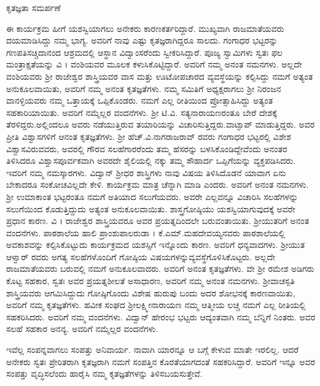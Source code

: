 {ಕೃತಜ್ಞತಾ ಸಮರ್ಪಣೆ \enginline{-}

ಈ ಕಾರ್ಯಕ್ರಮ ಹೀಗೆ ಯಶಸ್ವಿಯಾಗಲು  ಅನೇಕರು ಕಾರಣಕರ್ತರಿದ್ದಾರೆ. ಮುಖ್ಯವಾಗಿ ರಾಜಮಾತೆಯವರು ದಯಮಾಡಿಸಿದ್ದು ನಮ್ಮ ಭಾಗ್ಯ. ಅವರಿಗೆ ನಾವು ಎಷ್ಟು ಕೃತಜ್ಞರಾಗಿದ್ದರೂ ಸಾಲದು. ಗಂಗಾಧರ ಭಟ್ಟರನ್ನು ಗಣಪತಿಸಚ್ಚಿದಾನಂದ ಆಶ್ರಮ\-ದಲ್ಲಿ ಆಸ್ಥಾನ ವಿದ್ವಾಂಸರೆಂದು ಸ್ವೀಕರಿಸಿದ್ದಾರೆ. ಪೂಜ್ಯ ಸ್ವಾಮಿಗಳು ಸ್ವತಃ ಫಲ ಮಂತ್ರಾಕ್ಷತೆಯನ್ನು ವಿ । ವಂಶಿಯವರ ಮೂಲಕ ಕಳುಸಿಕೊಟ್ಟಿದ್ದಾರೆ. ಅವರಿಗೆ ನಮ್ಮ ಅನಂತ ನಮನಗಳು. ಅಲ್ಲದೇ ವಂಶಿಯವರು  ಶ್ರೀ ರಾಜೇಶ್ವರ ಶಾಸ್ತ್ರಿಯವರ ವಾಸ ಮತ್ತು ಊಟೋಪಚಾರದ ವ್ಯವಸ್ಥೆಯನ್ನು ಕಲ್ಪಿಸಿದ್ದು ನಮಗೆ ಅತ್ಯಂತ ಅನುಕೂಲ\-ವಾಯಿತು, ಅವರಿಗೆ ನಮ್ಮ ಅನಂತ ಕೃತಜ್ಞತೆಗಳು. ನಮ್ಮ ಸಮಿತಿಗೆ ಅಧ್ಯಕ್ಷರಾಗಲು ಶ್ರೀ ನಿರಂಜನ ವಾನಳ್ಳಿಯವರು ನಮ್ಮ ಒತ್ತಾಯಕ್ಕೆ ಒಪ್ಪಿಕೊಂಡರು.  ನಮಗೆ ಎಲ್ಲ ರೀತಿಯಿಂದ ಪ್ರೋತ್ಸಾಹಿಸಿದ್ದು ಅತ್ಯಂತ ಸಹಕಾರಿಯಾಯಿತು. ಅವರಿಗೆ ನಮ್ಮೆಲ್ಲರ ವಂದನೆಗಳು. ಶ್ರೀ ಟಿ.ವಿ. ಸತ್ಯನಾರಾಯಣರಂತೂ ಬೇರೆ ದೇಶಕ್ಕೆ ತೆರಳಿದ್ದರು.\break ಅಲ್ಲಿಂದಲೂ ಅವರು ನಡೆಯುತ್ತಿರುವ ತಯಾರಿಯನ್ನು ವಿಚಾರಿಸುತ್ತಿದ್ದರು.\break ವಾಟ್ಸಾಪ್ ಮಾಡುತ್ತಿದ್ದರು.  ಅವರ ಪ್ರೀತಿ ವಿಶ್ವಾಸಗಳಿಗೆ ಆನಂತ ಕೃತಜ್ಞತೆಗಳು. ಶ್ರೀ ಹೆಚ್.ವಿ.ನಾಗರಾಜರಾವ್ ರವರು ಗಂಗಾಧರ ಭಟ್ಟರಲ್ಲಿ ವಿಶೇಶ ವಿಶ್ವಾಸವಿರುವವರು, ಅವರಲ್ಲಿ ಗೌರವ ಸಲಹೆಗಾರರೆಂದು ತಮ್ಮ ಹೆಸರನ್ನು ಬಳಸಿಕೊಂಡಿದ್ದೇವೆಂದು ಅನಂತರ ತಿಳಿಸಿದರೂ ವಿಶ್ವಾಸಪೂರ್ವಕವಾಗಿ ಅವರದೇ ಶೈಲಿಯಲ್ಲಿ ನಕ್ಕು ತಮ್ಮ ಸೌಹಾರ್ದ ಒಪ್ಪಿಗೆಯನ್ನು ವ್ಯಕ್ತಪಡಿಸಿದರು. ಇವರಿಗೆ ನಮ್ಮ ನಮಸ್ಕಾರಗಳು. ವಿದ್ವಾನ್ ಶ್ರೀಧರ ಶಾಸ್ತ್ರಿಗಳು ನಾವು ವಿಷಯ ತಿಳಿಸಿದೊಡನೆ ಯಾವಾಗ ಏನು ಬೇಕಾದರೂ ಸಂಕೋಚವಿಲ್ಲದೇ ಕೇಳಿ. ಕಾರ್ಯಕ್ರಮ ಮಾತ್ರ ಚೆನ್ನಾಗಿ ಮಾಡಿ ಎಂದರು. ಅವರಿಗೆ ಅನಂತ ನಮನ\-ಗಳು. ಶ್ರೀ ಉಮಾಕಾಂತ ಭಟ್ಟರಂತೂ ನಮಗೆ ಅತಿಯಾದ ಸಲುಗೆಯವರು. ಅವರೇ ಎಲ್ಲವನ್ನೂ ವಿಚಾರಿಸಿ ಸಲಹೆಗಳನ್ನು ಸಲುಗೆಯಿಂದ ಕೊಡುತ್ತಿದ್ದುದು ಅತ್ಯಂತ ಅನುಕೂಲ\-ವಾಯಿತು. ಶಾಸ್ತ್ರಗೋಷ್ಠಿಯು ಯಶಸ್ವಿಯಾಗುವುದಕ್ಕೆ ಅವರೇ ಪ್ರಧಾನ ಕಾರಣ. ವಿ । ರಾಜೇಶ್ವರ ಶಾಸ್ತ್ರಿಯವರೂ ಅವರ ಪ್ರಯತ್ನದಿಂದಲೇ ಬರುವಂತಾಯಿತು. ಶ್ರೀಯುತರಿಗೆ ಅನಂತ ವಂದನೆಗಳು. ಪಾಠಶಾಲೆಯ ಹಾಲಿ ಪ್ರಾಂಶುಪಾಲರು\break ಡಾ । ಕೆ.ಎಮ್.ಮಹದೇವಯ್ಯನವರು ಪಾಠಶಾಲೆಯಲ್ಲಿ ಅವಕಾಶವನ್ನು ಕಲ್ಪಿಸಿ\-ಕೊಟ್ಟುದು ಕಾರ್ಯಕ್ರಮದ ಯಶಸ್ಸಿಗೆ ಇನ್ನೊಂದು ಕಾರಣ. ಅವರಿಗೆ ಧನ್ಯವಾದಗಳು. ಶ್ರೀಯುತ ಆಳ್ವಾರ್ ರವರು ಅಗತ್ಯ ಸಲಹೆಗಳೊಂದಿಗೆ ಗೋಷ್ಠಿಯ ವಿಷಯಗಳನ್ನು\break ವ್ಯವಸ್ಥೆಗೊಳಿಸಿಕೊಟ್ಟರು. ಅಲ್ಲದೇ ರಾಜಮಾತೆಯವರು ಬರುವಲ್ಲಿ ನಮಗೆ ಅನುಕೂಲವಾದರು. ಅವರಿಗೆ ಅನಂತ ಕೃತಜ್ಞತೆಗಳು. ವೇ ಶ್ರೀ ರಮೇಶ ಅಡಿಗರು ಕೊಟ್ಟ ಸಹಕಾರ, ಸ್ವತಃ ಅವರ ಪ್ರಯತ್ನಶೀಲತೆ ಅಸಾಧಾರಣ, ಅವರಿಗೆ ನಮ್ಮ ಅನಂತ ನಮನಗಳು.  ಶ್ರೀವಾಚಸ್ಪತಿ ಶಾಸ್ತ್ರಿಯವರು  ಆಗಮಿಸಿದ್ದುದು ಗೋಷ್ಠಿಗೊಂದು ವಿಶೇಷ ಹುರುಪು ಬಂದು ಅದರ  ಶೋಭನಕ್ಕೆ ಕಾರಣವಾಯಿತು, ಅವರಿಗೆ ನಮ್ಮ ಕೃತಜ್ಞತೆಗಳು. ಹವೀಕ ಸಂಘದ ಶ್ರೀಲಕ್ಷ್ಮೀನಾರಾಯಣ ನಮ್ಮ ಆತ್ಮೀಯ ಲಚ್ಚ ನಮಗೆ ಎಲ್ಲ ರೀತಿಯಲ್ಲಿ ಸಹಕರಿಸಿದರು. ಅವರಿಗೆ ನಮ್ಮ ವಂದನೆಗಳು. ವಿದ್ವಾನ್ ಹೇರಂಭ ಭಟ್ಟರು ಆದ್ಯಂತವಾಗಿ ನಮ್ಮ ಬೆನ್ನಿಗೆ ನಿಂತರು. ಅವರ ಸಲಹೆ ಸಹಕಾರ ಅನನ್ಯ. ಅವರಿಗೆ ನಮ್ಮೆಲ್ಲರ ವಂದನೆಗಳು. 

ಇವೆಲ್ಲ ಸಂಪನ್ನವಾಗಲು ಸಂಪತ್ತು ಅನಿವಾರ್ಯ. ನಾವಾಗಿ ಯಾರನ್ನೂ ಆ ಬಗ್ಗೆ ಕೇಳುವ ಮಾತೇ ಇರಲಿಲ್ಲ. ಆದರೆ ಅನೇಕರು ಸ್ವತಃ ಪ್ರೇರಿತರಾಗಿ ಕೃತಜ್ಞರಾಗಿ ನಮಗೆ ಸಂಪತ್ತಿನ ಕೊರತೆಯಾಗದಂತೆ ಸಹಕರಿಸಿದ್ದಾರೆ. ಅವರಿಗೆ ಇನ್ನೂ ಅವರ ಸಂಪತ್ತು ವೃದ್ಧಿಸಲೆಂದು ಹಾರೈಸಿ ನಮ್ಮ ಕೃತಜ್ಞತೆಗಳನ್ನು ತಿಳಿಸಬಯಸುತ್ತೇವೆ.

}

